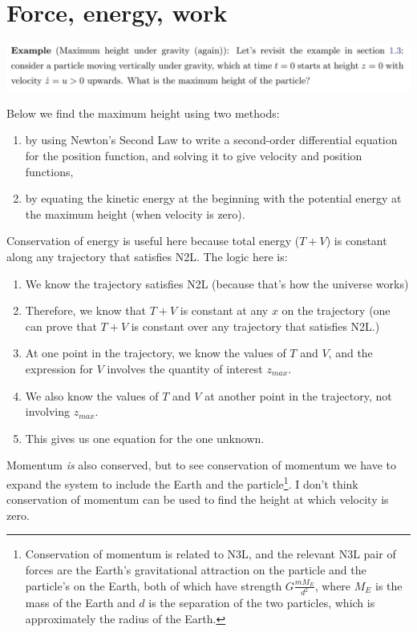\section{Force, energy, work}

\begin{mdframed}
  \includegraphics[width=400pt]{img/physics--classical-mechanics--oxford--dynamics--example--gravity.png}
\end{mdframed}

Below we find the maximum height using two methods:
\begin{enumerate}
\item by using Newton's Second Law to write a second-order differential equation for the position
  function, and solving it to give velocity and position functions,
\item by equating the kinetic energy at the beginning with the potential energy at the maximum
  height (when velocity is zero).
\end{enumerate}

Conservation of energy is useful here because total energy ($T + V$) is constant along any
trajectory that satisfies N2L. The logic here is:
\begin{enumerate}
\item We know the trajectory satisfies N2L (because that's how the universe works)
\item Therefore, we know that $T + V$ is constant at any $x$ on the trajectory (one can prove that
  $T+V$ is constant over any trajectory that satisfies N2L.)
\item At one point in the trajectory, we know the values of $T$ and $V$, and the expression for $V$
  involves the quantity of interest $z_{max}$.
\item We also know the values of $T$ and $V$ at another point in the trajectory, not involving
  $z_{max}$.
\item This gives us one equation for the one unknown.
\end{enumerate}

Momentum \textit{is} also conserved, but to see conservation of momentum we have to expand the
system to include the Earth and the particle\footnote{Conservation of momentum is related to N3L,
  and the relevant N3L pair of forces are the Earth's gravitational attraction on the particle and
  the particle's on the Earth, both of which have strength $G\frac{mM_E}{d^2}$, where $M_E$ is the
  mass of the Earth and $d$ is the separation of the two particles, which is approximately the
  radius of the Earth.}. I don't think conservation of momentum can be used to find the height at
which velocity is zero.


